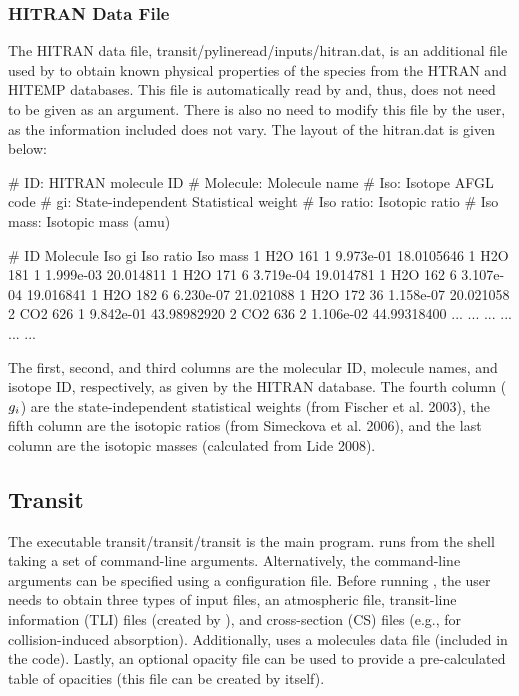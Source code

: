 \documentclass[letterpaper, 12pt]{article}
\begin{document}
\subsubsection{HITRAN Data File}

The HITRAN data file, {\tttm transit/pylineread/inputs/hitran.dat},
is an additional file used by {\pylineread} to obtain known physical
properties of the species from the HTRAN and HITEMP databases.  This
file is automatically read by {\pylineread} and, thus, does not need
to be given as an argument.  There is also no need to modify this file
by the user, as the information included does not vary.  The layout of
the {\tttm hitran.dat} is given below: \newline

\begin{plain}
# ID:         HITRAN molecule ID
# Molecule:   Molecule name
# Iso:        Isotope AFGL code
# gi:         State-independent Statistical weight
# Iso ratio:  Isotopic ratio
# Iso mass:   Isotopic mass (amu)

# ID Molecule Iso        gi         Iso ratio    Iso mass
 1   H2O      161         1         9.973e-01    18.0105646
 1   H2O      181         1         1.999e-03    20.014811
 1   H2O      171         6         3.719e-04    19.014781
 1   H2O      162         6         3.107e-04    19.016841
 1   H2O      182         6         6.230e-07    21.021088
 1   H2O      172        36         1.158e-07    20.021058
 2   CO2      626         1         9.842e-01    43.98982920
 2   CO2      636         2         1.106e-02    44.99318400
...  ...      ...        ...           ...           ...
\end{plain}

The first, second, and third columns are the molecular ID, molecule
names, and isotope ID, respectively, as given by the HITRAN database.
The fourth column ($g\sb{i}$) are the state-independent statistical
weights 
(from Fischer et al. 2003), 
the fifth column are
the isotopic ratios 
(from Simeckova et al. 2006), 
and the
last column are the isotopic masses 
(calculated from Lide 2008).

\subsection{Transit}
\label{sec:input-transit}

The executable {\tttm transit/transit/transit} is the main
{\transit} program.  {\transit} runs from the shell taking a set of
command-line arguments.  Alternatively, the command-line arguments can
be specified using a configuration file.  Before running {\transit},
the user needs to obtain three types of input files, an atmospheric
file, transit-line information (TLI) files (created by {\pylineread}),
and cross-section (CS) files (e.g., for collision-induced absorption).  Additionally,
{\transit} uses a molecules data file (included in the code).  Lastly,
an optional opacity file can be used to provide a pre-calculated table
of opacities (this file can be created by {\transit} itself).
\end{document}
